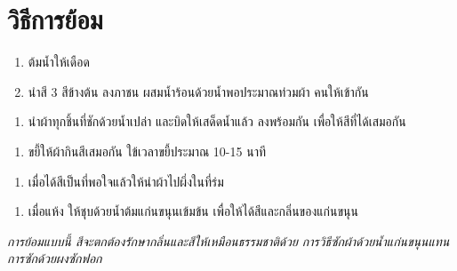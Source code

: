 

\section{วิธีการย้อม}

\begin{enumerate}
\def\labelenumi{(\arabic{enumi})}
\item
  ต้มน้ำให้เดือด
\item
  นำสี 3 สีข้างต้น ลงภาชน ผสมน้ำร้อนด้วยน้ำพอประมาณท่วมผ้า คนให้เข้ากัน
\end{enumerate}





\clearpage

\begin{enumerate}
\def\labelenumi{(\arabic{enumi})}
\setcounter{enumi}{2}
\tightlist
\item
  นำผ้าทุกชิ้นที่ชักด้วยน้ำเปล่า และบิดให้เสด็ดน้ำแล้ว ลงพร้อมกัน
  เพื่อให้สีที่ได้เสมอกัน
\end{enumerate}



\begin{enumerate}
\def\labelenumi{(\arabic{enumi})}
\setcounter{enumi}{3}
\tightlist
\item
  ขยี้ให้ผ้ากินสีเสมอกัน ใข้เวลาขยี้ประมาณ 10-15 นาที
\end{enumerate}



\clearpage

\begin{enumerate}
\def\labelenumi{(\arabic{enumi})}
\setcounter{enumi}{4}
\tightlist
\item
  เมื่อได้สีเป็นที่พอใจแล้วให้นำผ้าไปผึ่งในที่ร่ม
\end{enumerate}



\begin{enumerate}
\def\labelenumi{(\arabic{enumi})}
\setcounter{enumi}{5}
\tightlist
\item
  เมื่อแห้ง ให้ชุบด้วยน้ำต้มแก่นขนุนเข้มข้น
  เพื่อให้ได้สีและกลิ่นของแก่นขนุน
\end{enumerate}

\emph{การย้อมแบบนี้ สีจะตกต้องรักษากลิ่นและสีให้เหมือนธรรมชาติด้วย
การวิธีซักผ้าด้วยน้ำแก่นขนุนแทนการซักด้วยผงซักฟอก}

